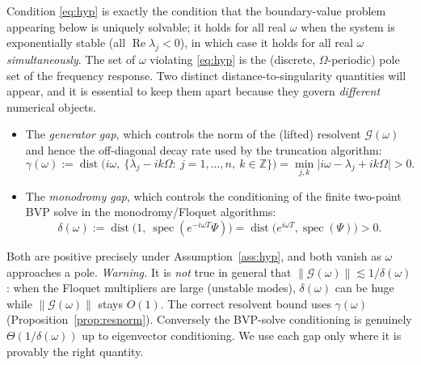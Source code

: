 \documentclass{amsart}
\theoremstyle{definition}
\DeclareMathOperator{\spec}{spec}
\DeclareMathOperator{\dist}{dist}
\newcommand{\Z}{\mathbb{Z}}
\begin{document}
Condition \eqref{eq:hyp} is exactly the condition that the boundary-value
problem appearing below is uniquely solvable; it holds for all real $\omega$
when the system is exponentially stable (all $\operatorname{Re}\lambda_j<0$), in
which case it holds for all real $\omega$ \emph{simultaneously}. The set of
$\omega$ violating \eqref{eq:hyp} is the (discrete, $\Omega$-periodic) pole set
of the frequency response. Two distinct distance-to-singularity
quantities will appear, and it is essential to keep them apart because they
govern \emph{different} numerical objects.
\begin{itemize}
\item The \emph{generator gap}, which controls the norm of the (lifted) resolvent
$\mathcal G(\omega)$ and hence the off-diagonal decay rate used by the
truncation algorithm:
\begin{equation}\label{eq:gengap}
\gamma(\omega):=\dist\!\Big(i\omega,\ \big\{\lambda_j-ik\Omega:\ j=1,\dots,n,\ k\in\Z\big\}\Big)
=\min_{j,k}\big|i\omega-\lambda_j+ik\Omega\big|>0 .
\end{equation}
\item The \emph{monodromy gap}, which controls the conditioning of the
finite two-point BVP solve in the monodromy/Floquet algorithms:
\begin{equation}\label{eq:gap}
\delta(\omega):=\dist\!\big(1,\ \spec(e^{-i\omega T}\Psi)\big)
=\dist\!\big(e^{i\omega T},\spec(\Psi)\big)>0 .
\end{equation}
\end{itemize}
Both are positive precisely under Assumption~\ref{ass:hyp}, and both vanish as
$\omega$ approaches a pole. \emph{Warning.} It is \emph{not} true in general that
$\|\mathcal G(\omega)\|\lesssim 1/\delta(\omega)$: when the Floquet multipliers
are large (unstable modes), $\delta(\omega)$ can be huge while
$\|\mathcal G(\omega)\|$ stays $O(1)$. The correct resolvent bound uses
$\gamma(\omega)$ (Proposition~\ref{prop:resnorm}). Conversely the BVP-solve
conditioning is genuinely $\Theta(1/\delta(\omega))$ up to eigenvector
conditioning. We use each gap only where it is provably the right quantity.
\end{document}
